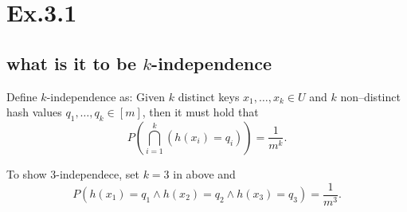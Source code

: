 \section*{Ex.3.1}
\subsection*{what is it to be $k$-independence}
Define $k$-independence as: Given $k$ distinct keys $x_1,\ldots,x_k\in{U}$ and $k$ non--distinct hash values $q_1,\ldots,q_k\in[m]$, then it must hold that 
$$
P(\bigcap_{i=1}^k (h(x_i)=q_i)) = \frac{1}{m^k}.
$$

To show 3-independece, set $k=3$ in above and 
$$
P(h(x_1)=q_1 \land h(x_2)=q_2 \land h(x_3)=q_3) = \frac{1}{m^3}.
$$